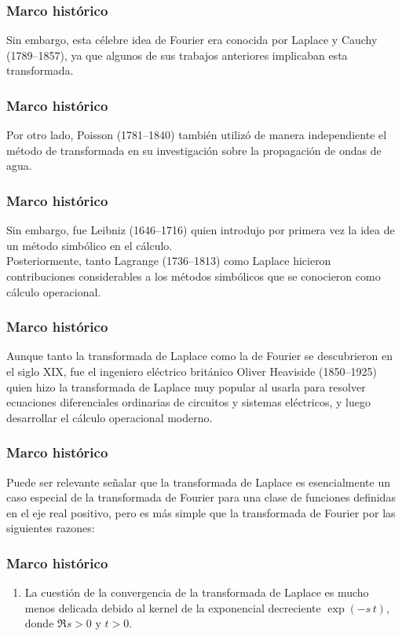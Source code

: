 \documentclass[12pt]{beamer}
\begin{document}
\begin{frame}
\frametitle{Marco histórico}
Sin embargo, esta célebre idea de Fourier era conocida por Laplace y Cauchy (1789–1857), ya que algunos de sus trabajos anteriores implicaban esta transformada.
\end{frame}
\begin{frame}
\frametitle{Marco histórico}
Por otro lado, Poisson (1781–1840) también utilizó de manera independiente el método de transformada en su investigación sobre la propagación de ondas de agua.
\end{frame}
\begin{frame}
\frametitle{Marco histórico}
Sin embargo, fue Leibniz (1646–1716) quien introdujo por primera vez la idea de un método simbólico en el cálculo.
\\
\bigskip
\pause
Posteriormente, tanto Lagrange (1736–1813) como Laplace hicieron contribuciones considerables a los métodos simbólicos que se conocieron como cálculo operacional.
\end{frame}
\begin{frame}
\frametitle{Marco histórico}
Aunque tanto la transformada de Laplace como la de Fourier se descubrieron en el siglo XIX, \pause fue el ingeniero eléctrico británico Oliver Heaviside (1850–1925) quien hizo la transformada de Laplace muy popular al usarla para resolver ecuaciones diferenciales ordinarias de circuitos y sistemas eléctricos, y luego desarrollar el cálculo operacional moderno.
\end{frame}
\begin{frame}
\frametitle{Marco histórico}
Puede ser relevante señalar que la transformada de Laplace es esencialmente un caso especial de la transformada de Fourier para una clase de funciones definidas en el eje real positivo, pero es más simple que la transformada de Fourier por las siguientes razones:
\end{frame}
\begin{frame}
\frametitle{Marco histórico}
\begin{enumerate}[<+->]
\item La cuestión de la convergencia de la transformada de Laplace es mucho menos delicada debido al kernel de la exponencial decreciente $\exp (-s \, t)$, donde $\Re{s} > 0$ y $t > 0$.
\seti
\end{enumerate}
\end{frame}
\end{document}
